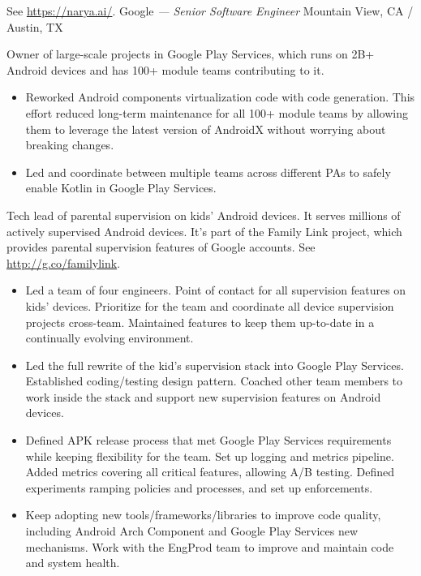 \documentclass[]{friggeri-cv} %
\begin{document}
\begin{entrylist}
{    See \url{https://narya.ai/}.
  }
  {Google \emph{--- Senior Software Engineer}}
  {Mountain View, CA / Austin, TX}
  {
    Owner of large-scale projects in Google Play Services,
    which runs on 2B+ Android devices and has 100+ module teams contributing to it.
    \begin{itemize}
      \item Reworked Android components virtualization code with code generation.
      This effort reduced long-term maintenance for all 100+ module teams
      by allowing them to leverage the latest version of AndroidX without worrying about breaking changes.
      \item Led and coordinate between multiple teams across different PAs to safely enable Kotlin in Google Play Services.
    \end{itemize}
    Tech lead of parental supervision on kids' Android devices. It serves millions of actively supervised Android devices.
    It's part of the Family Link project, which provides parental supervision features of Google accounts.
    See \url{http://g.co/familylink}.
    \begin{itemize}
      \item Led a team of four engineers.
      Point of contact for all supervision features on kids' devices.
      Prioritize for the team and coordinate all device supervision projects cross-team.
      Maintained features to keep them up-to-date in a continually evolving environment.
      \item Led the full rewrite of the kid's supervision stack into Google Play Services.
      Established coding/testing design pattern.
      Coached other team members to work inside the stack and support new supervision features on Android devices.
      \item Defined APK release process that met Google Play Services requirements while keeping flexibility for the team.
      Set up logging and metrics pipeline.
      Added metrics covering all critical features, allowing A/B testing.
      Defined experiments ramping policies and processes, and set up enforcements.
      \item Keep adopting new tools/frameworks/libraries to improve code quality,
      including Android Arch Component and Google Play Services new mechanisms.
      Work with the EngProd team to improve and maintain code and system health.
    \end{itemize}
  }
  \end{entrylist}
\end{document}
